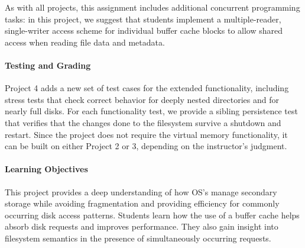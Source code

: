 As with all projects, this assignment includes additional concurrent programming 
tasks: in this project, we suggest that students implement 
a multiple-reader, single-writer access scheme for individual buffer cache blocks
to allow shared access when reading file data and metadata.

\paragraph{Testing and Grading}
Project 4 adds a new set of test cases for the extended functionality, including
stress tests that check correct behavior for deeply nested directories and 
for nearly full disks.
For each functionality test, we provide a sibling persistence test that verifies 
that the changes done to the filesystem survive a shutdown and restart.
Since the project does not require the virtual memory functionality, it can be built
on either Project 2 or 3, depending on the instructor's judgment.

\paragraph{Learning Objectives}
This project provides a deep understanding of how OS's manage secondary storage
while avoiding fragmentation and providing efficiency for commonly occurring 
disk access patterns.
Students learn how the use of a buffer cache helps absorb disk requests and
improves performance.
They also gain insight into filesystem semantics in the presence of 
simultaneously occurring requests.


